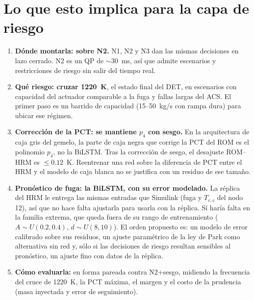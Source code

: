 \section{Lo que esto implica para la capa de riesgo}\label{sec:implicancias}
\begin{enumerate}
  \item \textbf{Dónde montarla: sobre N2.} N1, N2 y N3 dan las mismas decisiones en lazo
        cerrado. N2 es un QP de $\sim30$~ms, así que admite escenarios y restricciones de
        riesgo sin salir del tiempo real.
  \item \textbf{Qué riesgo: cruzar 1220~K}, el estado final del DET, en escenarios con
        capacidad del actuador comparable a la fuga y fallas largas del ACS. El primer paso es
        un barrido de capacidad (15--50~kg/s con rampa dura) para ubicar ese régimen.
  \item \textbf{Corrección de la PCT: se mantiene $p_4$ con sesgo.} En la arquitectura de
        caja gris del gemelo, la parte de caja negra que corrige la PCT del ROM es el
        polinomio $p_4$, no la BiLSTM. Tras la corrección de sesgo, el desajuste ROM--HRM es
        $\le0.12$~K. Reentrenar una red sobre la diferencia de PCT entre el HRM y el modelo de
        caja blanca no se justifica con un residuo de ese tamaño.
  \item \textbf{Pronóstico de fuga: la BiLSTM, con su error modelado.} La réplica del HRM le
        entrega las mismas entradas que Simulink (fuga y $T_{e,c}$ del nodo 12), así que no hace
        falta ajustarla para usarla con la réplica. Sí haría falta en la familia extrema, que
        queda fuera de su rango de entrenamiento ($A\sim U(0.2,0.4)$, $d\sim U(8,10)$). El
        orden propuesto es: un modelo de error calibrado sobre sus residuos, un ajuste
        paramétrico de la ley de Park como alternativa sin red y, sólo si las decisiones de
        riesgo resultan sensibles al pronóstico, un ajuste fino con datos de la réplica.
  \item \textbf{Cómo evaluarla:} en forma pareada contra N2+sesgo, midiendo la frecuencia del
        cruce de 1220~K, la PCT máxima, el margen y el costo de la prudencia (masa inyectada y
        error de seguimiento).
\end{enumerate}
